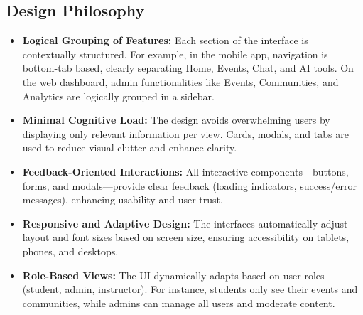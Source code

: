\subsection*{Design Philosophy}
\begin{itemize}
    \item \textbf{Logical Grouping of Features:} Each section of the interface is contextually structured. For example, in the mobile app, navigation is bottom-tab based, clearly separating Home, Events, Chat, and AI tools. On the web dashboard, admin functionalities like Events, Communities, and Analytics are logically grouped in a sidebar.
    
    \item \textbf{Minimal Cognitive Load:} The design avoids overwhelming users by displaying only relevant information per view. Cards, modals, and tabs are used to reduce visual clutter and enhance clarity.
    
    \item \textbf{Feedback-Oriented Interactions:} All interactive components—buttons, forms, and modals—provide clear feedback (loading indicators, success/error messages), enhancing usability and user trust.
    
    \item \textbf{Responsive and Adaptive Design:} The interfaces automatically adjust layout and font sizes based on screen size, ensuring accessibility on tablets, phones, and desktops.
    
    \item \textbf{Role-Based Views:} The UI dynamically adapts based on user roles (student, admin, instructor). For instance, students only see their events and communities, while admins can manage all users and moderate content.
\end{itemize}

